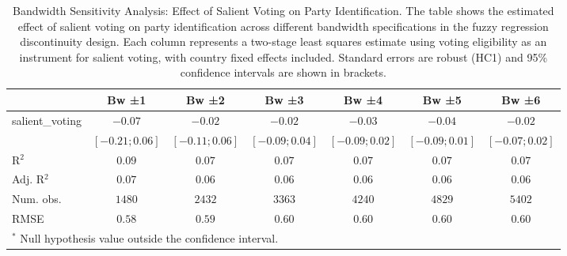 
\begin{table}
\begin{center}
\begin{tabular}{l c c c c c c}
\hline
 & Bw ±1 & Bw ±2 & Bw ±3 & Bw ±4 & Bw ±5 & Bw ±6 \\
\hline
salient\_voting & $-0.07$          & $-0.02$          & $-0.02$          & $-0.03$          & $-0.04$          & $-0.02$          \\
                & $ [-0.21; 0.06]$ & $ [-0.11; 0.06]$ & $ [-0.09; 0.04]$ & $ [-0.09; 0.02]$ & $ [-0.09; 0.01]$ & $ [-0.07; 0.02]$ \\
\hline
R$^2$           & $0.09$           & $0.07$           & $0.07$           & $0.07$           & $0.07$           & $0.07$           \\
Adj. R$^2$      & $0.07$           & $0.06$           & $0.06$           & $0.06$           & $0.06$           & $0.06$           \\
Num. obs.       & $1480$           & $2432$           & $3363$           & $4240$           & $4829$           & $5402$           \\
RMSE            & $0.58$           & $0.59$           & $0.60$           & $0.60$           & $0.60$           & $0.60$           \\
\hline
\multicolumn{7}{l}{\scriptsize{$^*$ Null hypothesis value outside the confidence interval.}}
\end{tabular}
\caption{Bandwidth Sensitivity Analysis: Effect of Salient Voting on Party Identification. The table shows the estimated effect of salient voting on party identification across different bandwidth specifications in the fuzzy regression discontinuity design. Each column represents a two-stage least squares estimate using voting eligibility as an instrument for salient voting, with country fixed effects included. Standard errors are robust (HC1) and 95\% confidence intervals are shown in brackets.}
\label{table:coefficients_pid}
\end{center}
\end{table}

